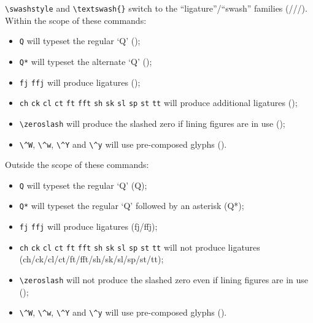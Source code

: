 \documentclass[11pt,british]{article}
\begin{document}
	\verb|\swashstyle| and \verb|\textswash{}| switch to the ``ligature''/``swash'' families (///). Within the scope of these commands:
	\begin{itemize}
		\item \verb|Q| will typeset the regular `Q' ();
		\item \verb|Q*| will typeset the alternate `Q' ();
		\item \verb|fj| \verb|ffj| will produce ligatures ();
		\item \verb|ch| \verb|ck| \verb|cl| \verb|ct| \verb|ft| \verb|fft| \verb|sh| \verb|sk| \verb|sl| \verb|sp| \verb|st| \verb|tt| will produce additional ligatures ();
		\item \verb|\zeroslash| will produce the slashed zero if lining figures are in use (\textswash{\textl{\zeroslash}/\texttl{\zeroslash}});
		\item \verb|\^W|, \verb|\^w|, \verb|\^Y| and \verb|\^y| will use pre-composed glyphs ().
	\end{itemize}

	Outside the scope of these commands:
	\begin{itemize}
		\item \verb|Q| will typeset the regular `Q' (Q);
		\item \verb|Q*| will typeset the regular `Q' followed by an asterisk (Q*);
		\item \verb|fj| \verb|ffj| will produce ligatures (fj/ffj);
		\item \verb|ch| \verb|ck| \verb|cl| \verb|ct| \verb|ft| \verb|fft| \verb|sh| \verb|sk| \verb|sl| \verb|sp| \verb|st|  \verb|tt| will not produce ligatures (ch/ck/cl/ct/ft/fft/sh/sk/sl/sp/st/tt);
		\item \verb|\zeroslash| will not produce the slashed zero even if lining figures are in use (\textl{\zeroslash/\texttl{\zeroslash}});
		\item \verb|\^W|, \verb|\^w|, \verb|\^Y| and \verb|\^y| will use pre-composed glyphs ().
	\end{itemize}
\end{document}
